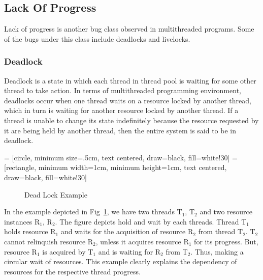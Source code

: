 \subsection{Lack Of Progress}

Lack of progress is another bug class observed in multithreaded programs. 
Some of the bugs under this class include deadlocks and livelocks. 

\subsubsection{Deadlock}

Deadlock is a state in which each thread in thread pool is waiting for some other thread to take action. 
In terms of multithreaded programming environment, deadlocks occur when one thread waits on a resource locked by another thread, which in turn is waiting for another resource locked by another thread. 
If a thread is unable to change its state indefinitely because the resource requested by it are being held by another thread, then the entire system is said to be in deadlock\cite{chaki2005concurrent}. 

 = [circle, minimum size=.5cm, text centered, draw=black, fill=white!30]
 = [rectangle, minimum width=1cm, minimum height=1cm, text centered, draw=black, fill=white!30]

\begin{figure}[h]
\centering
{}
\caption{Dead Lock Example}
\label{deadlock_example}
\end{figure}

In the example depicted in Fig~\ref{deadlock_example}, we have two threads T$_1$, T$_2$ and two resource instances R$_1$, R$_2$. 
The figure depicts hold and wait by each threads. 
Thread T$_1$ holds resource R$_1$ and waits for the acquisition of resource R$_2$ from thread T$_2$. 
T$_2$ cannot relinquish resource R$_2$, unless it acquires resource R$_1$ for its progress. 
But, resource R$_1$ is acquired by T$_1$ and is waiting for R$_2$ from T$_2$. 
Thus, making a circular wait of resources. 
This example clearly explains the dependency of resources for the respective thread progress. 

